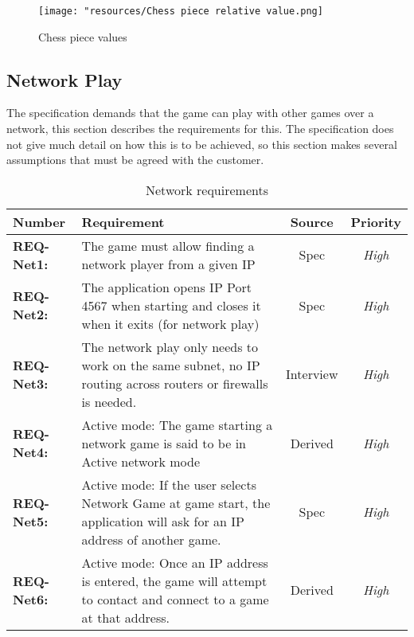\documentclass[a4paper,10pt]{article}
\begin{document}
\begin{figure}
  \centering
	\texttt{[image: "resources/Chess piece relative value.png]}
  \caption{Chess piece values  \label{fig:chessPieces}}
\end{figure}

\subsection{Network Play}

The specification demands that the game can play with other games over a network, this section describes the requirements for this. The specification does not give much detail on how this is to be achieved, so this section makes several assumptions that must be agreed with the customer.

\begin{table}[H]
\caption{Network  requirements}
\label{table:networkReqs}
\begin{tabular}{|| l | p{10.5cm}  |  c  | c ||} \hline  
\textbf{Number} & \textbf{Requirement} & \textbf{Source} & \textbf{Priority}\\ \hline

\textbf{REQ-Net1:}  & The game must allow finding a network player from a given IP& Spec & \textit{ High} \\

\textbf{REQ-Net2:} &
The application opens IP Port 4567 when starting and closes it when it exits  (for network play)
& Spec  &  \textit{High}\\

\textbf{REQ-Net3:} &
The network play only needs to work on the same subnet, no IP routing across routers or firewalls is needed. 
& Interview  &  \textit{High}\\

\textbf{REQ-Net4:} &  
Active mode: The game starting a network game is said to be in Active network mode
& Derived  &  \textit{High}\\

\textbf{REQ-Net5:} &  
Active mode: If the user selects Network Game at game start, the application will ask for an IP address of another game.
& Spec  &  \textit{High}\\

\textbf{REQ-Net6:} &  
Active mode: Once an IP address is entered, the game will attempt to contact and connect to a game at that address.
& Derived  &  \textit{High}\\


\end{tabular}
\end{table}
\end{document}
